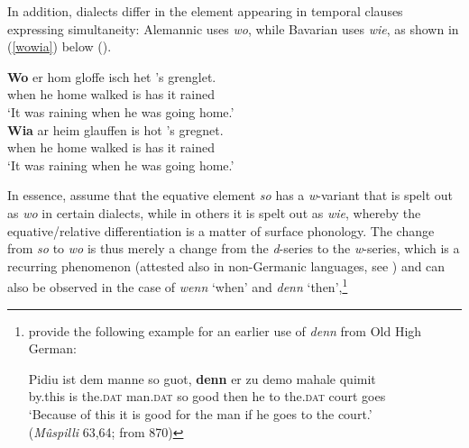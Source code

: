 In addition, dialects differ in the element appearing in temporal clauses expressing simultaneity: Alemannic uses \textit{wo}, while Bavarian uses \textit{wie}, as shown in (\ref{wowia}) below (\citealt[153, ex. 52]{brandnerbraeuning2013}).

\ea \label{wowia}
\ea \gll \textbf{Wo} er hom gloffe isch het 's grenglet.\\
when he home walked is has it rained\\
\glt `It was raining when he was going home.'\\
\ex \gll \textbf{Wia} ar heim glauffen is hot 's gregnet.\\
when he home walked is has it rained\\
\glt `It was raining when he was going home.'
\z
\z

In essence, \citet[153]{brandnerbraeuning2013} assume that the equative element \textit{so} has a \textit{w}-variant that is spelt out as \textit{wo} in certain dialects, while in others it is spelt out as \textit{wie}, whereby the equative/relative differentiation is a matter of surface phonology. The change from \textit{so} to \textit{wo} is thus merely a change from the \textit{d}-series to the \textit{w}-series, which is a recurring phenomenon (attested also in non-Germanic languages, see \citealt{diessel2003}) and can also be observed in the case of \textit{wenn} `when' and \textit{denn} `then',\footnote{\citet[155, ex. 54]{brandnerbraeuning2013} provide the following example for an earlier use of \textit{denn} from Old High German:

\ea \gll Pidiu ist dem manne so guot, \textbf{denn} er zu demo mahale quimit\\
by.this is the.\textsc{dat} man.\textsc{dat} so good then he to the.\textsc{dat} court goes\\
\glt `Because of this it is good for the man if he goes to the court.'\\
(\textit{Mûspilli} 63,64; from 870)
\z

}
